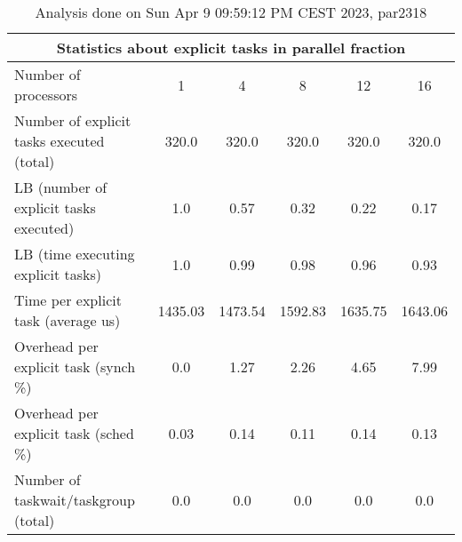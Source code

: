 \begin{table}[h]
\begin{center}
\begin{tabular}{|l|c|c|c|c|c|}
\hline
\multicolumn{6}{|c|}{Statistics about explicit tasks in parallel fraction} \\
\hline
\hline
Number of processors & 1 & 4 & 8 & 12 & 16 \\
\hline
\hline
Number of explicit tasks executed (total)        &           320.0 &           320.0 &           320.0 &           320.0 &           320.0 \\
\hline
LB (number of explicit tasks executed)           &             1.0 &            0.57 &            0.32 &            0.22 &            0.17 \\
\hline
LB (time executing explicit tasks)               &             1.0 &            0.99 &            0.98 &            0.96 &            0.93 \\
\hline
Time per explicit task (average us)                 &         1435.03 &         1473.54 &         1592.83 &         1635.75 &         1643.06 \\
\hline
Overhead per explicit task (synch \%)             &             0.0 &            1.27 &            2.26 &            4.65 &            7.99 \\
\hline
Overhead per explicit task (sched \%)             &            0.03 &            0.14 &            0.11 &            0.14 &            0.13 \\
\hline
Number of taskwait/taskgroup (total)             &             0.0 &             0.0 &             0.0 &             0.0 &             0.0 \\
\hline
\end{tabular}
\end{center}
\caption{ Analysis done on Sun Apr  9 09:59:12 PM CEST 2023, par2318}
\end{table}
